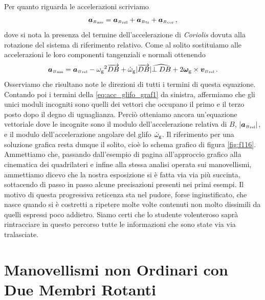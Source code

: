 \noindent Per quanto riguarda le accelerazioni scriviamo
\begin{equation}
{{\bm a}_{\scriptscriptstyle{B}}}_{\scriptscriptstyle{{\rm ass}}}= 
{{\bm a}_{\scriptscriptstyle{B}}}_{\scriptscriptstyle{{\rm rel}}} 
+{{\bm a}_{\scriptscriptstyle{B}}}_{\scriptscriptstyle{{\rm tr}}} 
+{{\bm a}_{\scriptscriptstyle{B}}}_{\scriptscriptstyle{{\rm cor}}}\,,
\label{eq:acc_glifo_graf0}
\end{equation}
\noindent dove si nota la presenza del termine dell'accelerazione di {\em Coriolis}
dovuta alla rotazione del sistema di riferimento relativo.
Come al solito sostituiamo alle accelerazioni le loro componenti tangenziali
e normali ottenendo
\begin{equation}
{{\bm a}_{\scriptscriptstyle{B}}}_{\scriptscriptstyle{{\rm ass}}}= 
{{\bm a}_{\scriptscriptstyle{B}}}_{\scriptscriptstyle{{\rm rel}}} 
-{\omega_{\rm g}}^2 \overrightarrow{DB} + \dot{\omega}_{\rm g}|\overrightarrow{DB}|\widehat{{\perp{DB}}}+
2{\bm \omega}_{\rm g}\times
{{\bm v}_{\scriptscriptstyle{B}}}_{\scriptscriptstyle{{\rm rel}}}\,.
\label{eq:acc_glifo_graf1}
\end{equation}
\vskip 1mm
\noindent Osserviamo che risultano note le direzioni di tutti i termini
di questa equazione.
Contando poi i termini della \ref{eq:acc_glifo_graf1} da sinistra,
affermiamo che gli unici moduli incogniti
sono quelli dei vettori che occupano il primo e il terzo posto
dopo il degno di uguaglianza. 
Perci\`o otteniamo ancora un'equazione vettoriale
dove le incognite sono
il modulo dell'accelerazione relativa di $B$,
$|{{\bm a}_{\scriptscriptstyle{B}}}_{\scriptscriptstyle{{\rm rel}}}|$,
e il modulo dell'accelerazione angolare del glifo
${\dot\omega_{\rm g}}$.
Il riferimento per una soluzione grafica resta dunque 
il solito, cio\`e lo schema grafico di figura \ref{fig:f116}.
Ammettiamo che, passando dall'esempio di pagina \pageref{fig:f116}
all'approccio grafico alla cinematica dei quadrilateri e infine
alla stessa analisi operata sui manovellismi, ammettiamo
dicevo che la nostra esposizione si 
\`e fatta via via pi\`u succinta, sottacendo di passo in passo
alcune precisazioni presenti nei primi esempi.
Il motivo di questa progressiva reticenza sta nel pudore, forse ingiustificato,
che nasce quando si \`e costretti a ripetere molte volte contenuti non
molto dissimili da quelli espressi poco addietro.
 Siamo certi che lo studente volenteroso
sapr\`a rintracciare in questo percorso tutte le informazioni che
sono state via via tralasciate.


\section{Manovellismi non Ordinari con Due Membri Rotanti}

